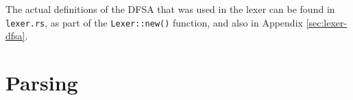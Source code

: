 \documentclass{article}
\newcommand{\code}[1]{\texttt{#1}}
\begin{document}
\begin{figure}[H]
    \centering
\end{figure}

The actual definitions of the DFSA that was used in the lexer can be found in
\code{lexer.rs}, as part of the \code{Lexer::new()} function, and also in
Appendix \ref{sec:lexer-dfsa}.


\newpage

\section{Parsing}

\newpage



\newpage

\printbibliography
\end{document}
